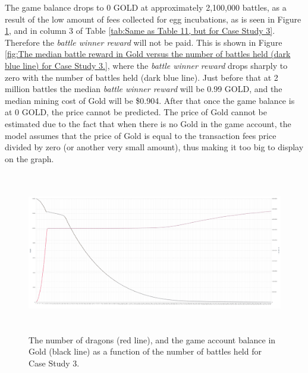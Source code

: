 \documentclass[12pt]{article}
\begin{document}
{The game balance drops to 0 GOLD at approximately 2,100,000 battles, as a result of the low amount of fees collected for egg incubations, as is seen in Figure \ref{fig:The number of dragons (red line), and the game account balance in Gold (black line) as a function of the number of battles held for Case Study 3.}}, and in column 3 of  Table \ref{tab:Same as Table 11, but for Case Study 3}. Therefore the \textit{battle winner reward} will not be paid. This is shown in Figure \ref{fig:The median battle reward in Gold versus the number of battles held (dark blue line) for Case Study 3.}, where the {\it battle winner reward} drops sharply to zero with the number of battles held (dark blue line). Just before that at 2 million battles the median {\it battle winner reward} will be 0.99 GOLD, and the median mining cost of Gold will be \$0.904.  After that once the game balance is at 0 GOLD, the price cannot be predicted. The price of Gold cannot be estimated due to the fact that when there is no Gold in the game account, the model assumes that the price of Gold is equal to the transaction fees price divided by zero (or another very small amount), thus making it too big to display on the graph.\par




\begin{figure}[H]
	\begin{Center}
		\includegraphics[width=6.27in,height=2.78in]{./media/CS3nimage17.png}
		\caption{The number of dragons (red line), and the game account balance in Gold (black line) as a function of the number of battles held for Case Study 3.}
		\label{fig:The number of dragons (red line), and the game account balance in Gold (black line) as a function of the number of battles held for Case Study 3.}
	\end{Center}
\end{figure}
\end{document}
